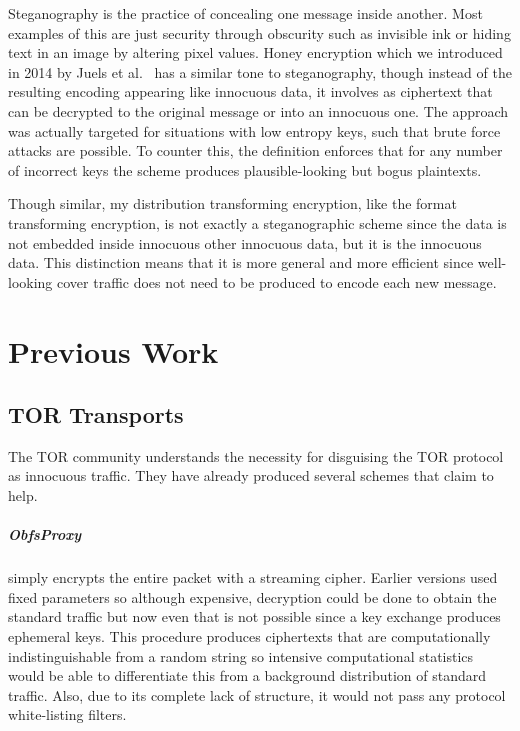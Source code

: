 \documentclass[ %
                    author={Samuel Russell},
                supervisor={Prof. Bogdan Warinschi},
                    degree={MEng},
                     title={Innocuous Ciphertexts},
                  subtitle={The DE-CENSOR Scheme},
                      type={Research},
                      year={2018} ]{dissertation}
\begin{document}
Steganography is the practice of concealing one message inside another.
Most examples of this are just security through obscurity such as invisible ink or hiding text in an image by altering pixel values.
Honey encryption which we introduced in 2014 by Juels et al.~\cite{honey} has a similar tone to steganography, though instead of the resulting encoding appearing like innocuous data, it involves as ciphertext that can be decrypted to the original message or into an innocuous one.
The approach was actually targeted for situations with low entropy keys, such that brute force attacks are possible. To counter this, the definition enforces that for any number of incorrect keys the scheme produces plausible-looking but bogus plaintexts.

Though similar, my distribution transforming encryption, like the format transforming encryption, is not exactly a steganographic scheme since the data is not embedded inside innocuous other innocuous data, but it is the innocuous data. This distinction means that it is more general and more efficient since well-looking cover traffic does not need to be produced to encode each new message.


\chapter{Previous Work}\label{prev_work}

\section{TOR Transports}

The TOR community understands the necessity for disguising the TOR protocol as innocuous traffic.
They have already produced several schemes that claim to help.

\paragraph{ObfsProxy} simply encrypts the entire packet with a streaming cipher. Earlier versions used fixed parameters so although expensive, decryption could be done to obtain the standard traffic but now even that is not possible since a key exchange produces ephemeral keys. This procedure produces ciphertexts that are computationally indistinguishable from a random string so intensive computational statistics would be able to differentiate this from a background distribution of standard traffic. Also, due to its complete lack of structure, it would not pass any protocol white-listing filters.
\end{document}
